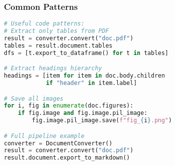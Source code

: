 \begin{frame}[fragile]\frametitle{Common Patterns}
\begin{lstlisting}[language=python,basicstyle=\tiny]
# Useful code patterns:
# Extract only tables from PDF
result = converter.convert("doc.pdf")
tables = result.document.tables
dfs = [t.export_to_dataframe() for t in tables]

# Extract headings hierarchy
headings = [item for item in doc.body.children 
            if "header" in item.label]

# Save all images
for i, fig in enumerate(doc.figures):
    if fig.image and fig.image.pil_image:
        fig.image.pil_image.save(f"fig_{i}.png")

# Full pipeline example
converter = DocumentConverter()
result = converter.convert("doc.pdf")
result.document.export_to_markdown()
\end{lstlisting}
\end{frame}